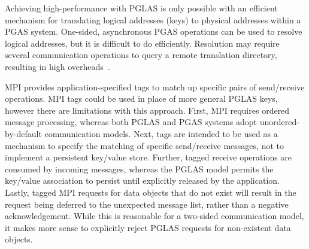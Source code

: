 

Achieving high-performance with PGLAS is only possible with an efficient
mechanism for translating logical addresses (keys) to physical addresses within
a PGAS system. One-sided, asynchronous PGAS operations can be used to resolve
logical addresses, but it is difficult to do efficiently. Resolution may
require several communication operations to query a remote translation 
directory, resulting in high overheads~\cite{namashivayam:15}.

MPI provides application-specified tags to match up specific pairs of
send/receive operations. MPI tags could be used in place of more general PGLAS
keys, however there are limitations with this approach. First, MPI requires
ordered message processing, whereas both PGLAS and PGAS systems adopt
unordered-by-default communication models. Next, tags are intended to be used
as a mechanism to specify the matching of specific send/receive messages, not
to implement a persistent key/value store. Further, tagged receive operations are
consumed by incoming messages, whereas the PGLAS model permits the key/value
association to persist until explicitly released by the application. Lastly,
tagged MPI requests for data objects that do not exist will result in the
request being deferred to the unexpected message list, rather than a negative
acknowledgement. While this is reasonable for a two-sided communication model,
it makes more sense to explicitly reject PGLAS requests for non-existent data
objects.

